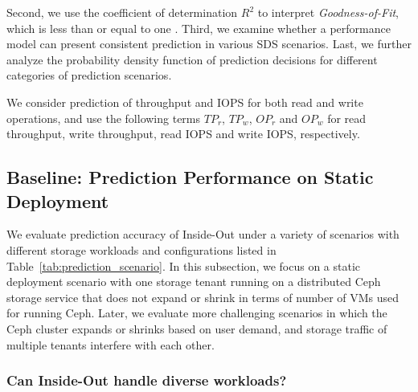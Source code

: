 Second, we use the coefficient of determination $R^2$ to interpret \emph{Goodness-of-Fit}, which is less than or equal to one \cite{Noorshams2013}.
Third, we examine whether a performance model can present consistent prediction in various SDS scenarios.
Last, we further analyze the probability density function of prediction decisions for different categories of prediction scenarios.

We consider prediction of throughput and IOPS for both read and write operations, and use the following terms $TP_r$, $TP_w$, $OP_r$ and $OP_w$ for read 
throughput, write throughput, read IOPS and write IOPS, respectively.



\subsection{Baseline: Prediction Performance on Static Deployment}
%

We evaluate prediction accuracy of Inside-Out under a variety of scenarios 
with different storage workloads and configurations
listed in Table~\ref{tab:prediction_scenario}.
In this subsection, we focus on a static deployment scenario with one storage tenant 
running on a distributed Ceph storage service that does not expand or shrink in terms 
of number of VMs used for running Ceph.
Later, we evaluate more challenging scenarios 
in which the Ceph cluster expands or shrinks based on user demand,
and storage traffic of multiple tenants interfere with each other.




\vspace{1ex}
\subsubsection{Can Inside-Out handle diverse workloads?}
\label{sec:changing_workload}

